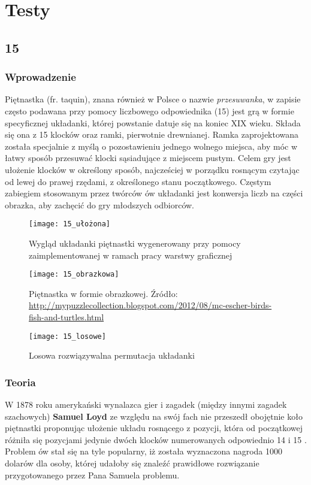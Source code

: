 \chapter{Testy}
\thispagestyle{chapterBeginStyle}

\section{15}
    \subsection{Wprowadzenie}
        Piętnastka (fr. taquin), znana również w Polsce o nazwie \textit{przesuwanka}, w zapisie często podawana przy pomocy liczbowego
        odpowiednika (15) jest grą w formie specyficznej
        układanki, której powstanie datuje się na koniec XIX wieku. Składa się ona z 
        15 klocków oraz ramki, pierwotnie drewnianej. Ramka zaprojektowana została specjalnie z myślą
        o pozostawieniu jednego wolnego miejsca, aby móc w łatwy sposób przesuwać klocki sąsiadujące z miejscem 
        pustym. Celem gry jest ułożenie klocków w określony sposób, najcześciej w porządku rosnącym czytając 
        od lewej do prawej rzędami, z określonego stanu początkowego. Częstym zabiegiem stosowanym przez 
        twórców ów układanki jest konwersja liczb na części obrazka, aby zachęcić do gry młodszych odbiorców.

        \begin{figure}[H]
            \texttt{[image: 15\_ułożona]}
            \centering
            \caption{Wygląd układanki piętnastki wygenerowany przy pomocy zaimplementowanej w ramach pracy warstwy graficznej}
        \end{figure}

        \begin{figure}[H]
            \texttt{[image: 15\_obrazkowa]}
            \centering
            \caption{Piętnastka w formie obrazkowej. Źródło: \url{http://mypuzzlecollection.blogspot.com/2012/08/mc-escher-birds-fish-and-turtles.html}}
        \end{figure}

        \begin{figure}[H]
            \texttt{[image: 15\_losowe]}
            \centering
            \caption{Losowa rozwiązywalna permutacja układanki}
        \end{figure}

    \subsection{Teoria}
        W 1878 roku amerykański wynalazca gier i zagadek (między innymi zagadek szachowych) \textbf{Samuel Loyd} ze względu na swój fach 
        nie przeszedł obojętnie koło piętnastki proponując ułożenie układu rosnącego z pozycji, która 
        od początkowej różniła się pozycjami jedynie dwóch klocków numerowanych odpowiednio 14 i 15 \cite{FifteenLoydProblem}.
        Problem ów stał się na tyle popularny, iż została wyznaczona nagroda 1000 dolarów dla osoby, której udałoby się 
        znaleźć prawidłowe rozwiązanie przygotowanego przez Pana Samuela problemu.

